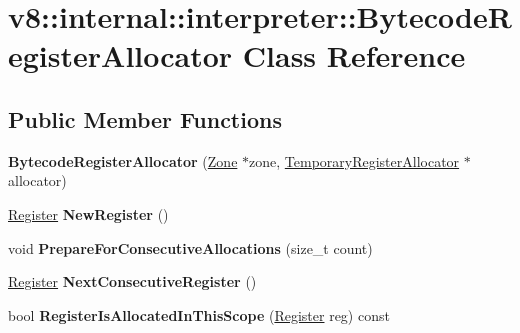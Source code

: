 \hypertarget{classv8_1_1internal_1_1interpreter_1_1_bytecode_register_allocator}{}\section{v8\+:\+:internal\+:\+:interpreter\+:\+:Bytecode\+Register\+Allocator Class Reference}
\label{classv8_1_1internal_1_1interpreter_1_1_bytecode_register_allocator}
\subsection*{Public Member Functions}
\begin{DoxyCompactItemize}
\item 
{\bfseries Bytecode\+Register\+Allocator} (\hyperlink{classv8_1_1internal_1_1_zone}{Zone} $\ast$zone, \hyperlink{classv8_1_1internal_1_1interpreter_1_1_temporary_register_allocator}{Temporary\+Register\+Allocator} $\ast$allocator)\hypertarget{classv8_1_1internal_1_1interpreter_1_1_bytecode_register_allocator_ae33426eae2fb3c5cb540f4f493fb1180}{}\label{classv8_1_1internal_1_1interpreter_1_1_bytecode_register_allocator_ae33426eae2fb3c5cb540f4f493fb1180}

\item 
\hyperlink{classv8_1_1internal_1_1interpreter_1_1_register}{Register} {\bfseries New\+Register} ()\hypertarget{classv8_1_1internal_1_1interpreter_1_1_bytecode_register_allocator_ae8468fa1ccff28941fcbf2ebe13fac41}{}\label{classv8_1_1internal_1_1interpreter_1_1_bytecode_register_allocator_ae8468fa1ccff28941fcbf2ebe13fac41}

\item 
void {\bfseries Prepare\+For\+Consecutive\+Allocations} (size\+\_\+t count)\hypertarget{classv8_1_1internal_1_1interpreter_1_1_bytecode_register_allocator_a61565fe31057d9b803fd0d7301bb702b}{}\label{classv8_1_1internal_1_1interpreter_1_1_bytecode_register_allocator_a61565fe31057d9b803fd0d7301bb702b}

\item 
\hyperlink{classv8_1_1internal_1_1interpreter_1_1_register}{Register} {\bfseries Next\+Consecutive\+Register} ()\hypertarget{classv8_1_1internal_1_1interpreter_1_1_bytecode_register_allocator_a6d6ac6ed29c2533bd461f2083267aced}{}\label{classv8_1_1internal_1_1interpreter_1_1_bytecode_register_allocator_a6d6ac6ed29c2533bd461f2083267aced}

\item 
bool {\bfseries Register\+Is\+Allocated\+In\+This\+Scope} (\hyperlink{classv8_1_1internal_1_1interpreter_1_1_register}{Register} reg) const \hypertarget{classv8_1_1internal_1_1interpreter_1_1_bytecode_register_allocator_aeaa3d2473e3546c0b27fdc4001049038}{}\label{classv8_1_1internal_1_1interpreter_1_1_bytecode_register_allocator_aeaa3d2473e3546c0b27fdc4001049038}


\end{DoxyCompactItemize}
